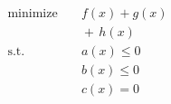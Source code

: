 \documentclass{article}
\begin{document}
\begin{subequations}
\begin{eqnarray}
\operatorname{minimize}\; & & f(x) + g(x)
\nonumber\\
& & {} +\, h(x) \label{eq:obj}\\
\text{s.t.}\; & & a(x) \leq 0 \label{eq:ca}\\
& & b(x) \leq 0 \label{eq:cb}\\
& & c(x) = 0 \label{eq:cc}
\end{eqnarray}
\end{subequations}
\end{document}
